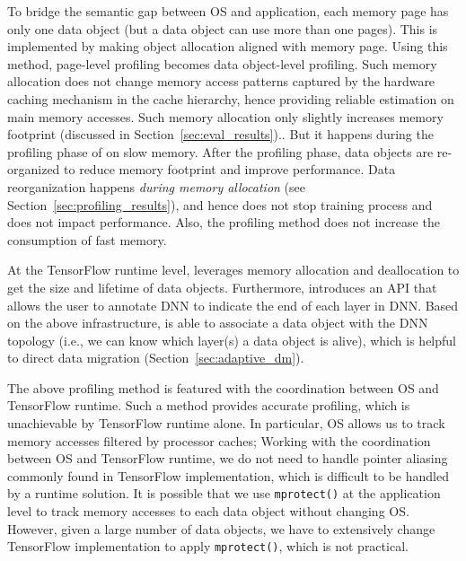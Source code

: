 To bridge the semantic gap between OS and application, each memory page has only one data object (but a data object can use more than one pages). \textcolor{check}{This is implemented by making object allocation aligned with memory page.} Using this method, page-level profiling becomes data object-level profiling. Such memory allocation does not change memory access patterns captured by the hardware caching mechanism in the cache hierarchy, hence providing reliable estimation on main memory accesses. \textcolor{check}{Such memory allocation only slightly increases memory footprint (discussed in Section~\ref{sec:eval_results}).}. But it happens during the profiling phase of \name on slow memory. After the profiling phase, data objects are re-organized to reduce memory footprint and improve performance. Data reorganization happens \textit{during memory allocation} (see Section~\ref{sec:profiling_results}), and hence does not stop training process and does not impact performance. Also, the profiling method does not increase the consumption of fast memory. 


At the TensorFlow runtime level, \name leverages memory allocation and deallocation to get the size and lifetime of data objects. Furthermore, \name introduces an API that allows the user to annotate DNN to indicate the end of each layer in DNN.
Based on the above infrastructure, \name is able to associate a data object with the DNN topology (i.e., we can know which layer(s) a data object is alive), 
which is helpful to direct data migration (Section~\ref{sec:adaptive_dm}). 

\textcolor{check}{The above profiling method is featured with the coordination between OS and TensorFlow runtime. Such a method provides accurate profiling, which is unachievable by TensorFlow runtime alone. In particular, OS allows us to track memory accesses filtered by processor caches; Working with the coordination between OS and TensorFlow runtime, we do not need to handle pointer aliasing commonly found in TensorFlow implementation, which is difficult to be handled by a runtime solution. It is possible that we use \texttt{mprotect()} at the application level to track memory accesses to each data object without changing OS. However, given a large number of data objects, we have to extensively change TensorFlow implementation to apply \texttt{mprotect()}, which is not practical.}


